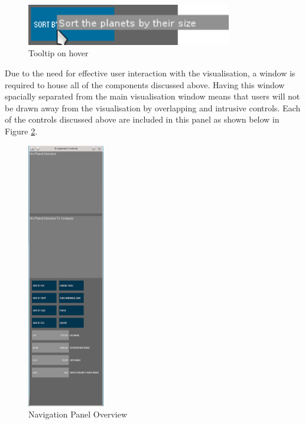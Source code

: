 \begin{figure}[H]
  \centering
      \includegraphics[width=0.8\textwidth]{images/tooltip.jpg}
  \caption{Tooltip on hover}
  \label{fig:tooltip}
\end{figure}

Due to the need for effective user interaction with the visualisation, a window
is required to house all of the components discussed above. Having this window
spacially separated from the main visualisation window means that users will not
be drawn away from the visualisation by overlapping and intrusive controls. Each
of the controls discussed above are included in this panel as shown below in
Figure \ref{fig:nav}.

\begin{figure}[H]
  \centering
      \includegraphics[width=0.3\textwidth]{images/nav.png}
  \caption{Navigation Panel Overview}
  \label{fig:nav}
\end{figure}

